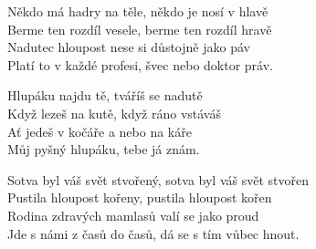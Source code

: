 \ve{}
Někdo má hadry na těle, někdo je nosí v hlavě\\
Berme ten rozdíl vesele, berme ten rozdíl hravě \\
Nadutec hloupost nese si důstojně jako páv \\
Platí to v každé profesi, švec nebo doktor práv.

\cho{}
Hlupáku najdu tě, tváříš se nadutě\\
Když lezeš na kutě, když ráno vstáváš \\
Ať jedeš v kočáře a nebo na káře  \\
Můj pyšný hlupáku, tebe já znám.

\ve{}
Sotva byl váš svět stvořený, sotva byl váš svět stvořen \\
Pustila hloupost kořeny, pustila hloupost kořen\\
Rodina zdravých mamlasů valí se jako proud \\
Jde s námi z časů do časů, dá se s tím vůbec hnout.
\cho{}
\esong{}